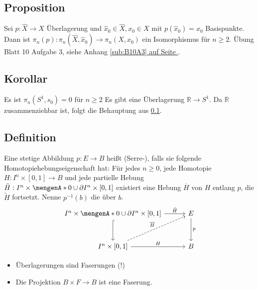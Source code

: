 \subsection[Proposition: Für $n \ge 2$ und eine Überlagerung $p$ ist $\pi_n(p)$ ein Isomorphismus]{Proposition} %
\label{sub:148}
Sei $p : \hat{X} \to X$ Überlagerung und $\hat{x}_0 \in \hat{X}, x_0 \in X$ mit $p(\hat{x}_0) = x_0$ Basispunkte. Dann ist 
$\pi_n(p) : \pi_n(\hat{X}, \hat{x}_0) \to \pi_n(X,x_0)$ ein Isomorphismus für $n \ge 2$.
Übung Blatt 10 Aufgabe 3, siehe Anhang \hyperref[sub:B10A3]{\ref*{sub:B10A3} auf Seite \pageref*{sub:B10A3}}.

\subsection[Korollar: $\pi_n(S^1, s_0) = 0$ für $n \ge 2$]{Korollar} %
\label{sub:149}
Es ist $\pi_n(S^1, s_0) = 0$ für $n \ge 2$
Es gibt eine Überlagerung $\mathds{R} \to S^1$. Da $\mathds{R}$ zusammenziehbar ist, folgt die Behauptung aus \ref{sub:148}. \bewende

\subsection[Definition: Serre-Faserung]{Definition} %
\label{sub:1410}
Eine stetige Abbildung $p : E \to B$ heißt (Serre-), falls sie folgende Homotopiehebungseigenschaft hat: Für jedes $n \ge 0$, jede Homotopie 
$H : I^n \times [0,1] \to B$ und jede partielle Hebung $\tilde{H} : I^n \times \set{0} \cup \partial I^n \times [0,1]$ existiert eine Hebung $\overline{H}$ von $H$
entlang $p$, die $\tilde{H}$ fortsetzt. Nenne $p ^{-1}(b)$ die  über $b$. 
\[
	\begin{tikzcd}[row sep=3em, column sep=3em]
		I^n \times \set{0} \cup \partial I^n \times [0,1] \rar["\tilde{H}"]  \dar[hook]& E \dar["p"] \\
		I^n \times [0,1] \rar["H"] \urar[dashed, "\overline{H} "]& B
	\end{tikzcd}
\]
\begin{itemize}
	\item Überlagerungen sind Faserungen (!)
	\item Die Projektion $B \times F \to B$ ist eine Faserung.
\end{itemize}

